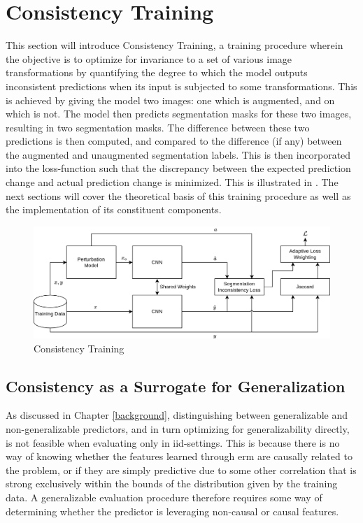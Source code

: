 \section{Consistency Training}
This section will introduce Consistency Training, a training procedure wherein the objective is to optimize for invariance to a set of various image transformations by quantifying the degree to which the model outputs inconsistent predictions when its input is subjected to some transformations. This is achieved by giving the model two images: one which is augmented, and on which is not. The model then predicts segmentation masks for these two images, resulting in two segmentation masks. The difference between these two predictions is then computed, and compared to the difference (if any) between the augmented and unaugmented segmentation labels. This is then incorporated into the loss-function such that the discrepancy between the expected prediction change and actual prediction change is minimized. This is illustrated in . The next sections will cover the theoretical basis of this training procedure as well as the implementation of its constituent components.  

\begin{figure}[ht]
    \centering
    \includegraphics[width=\linewidth]{illustrations/consistency_training.png}
    \caption{Consistency Training}
    \label{fig:consistency_training}
\end{figure}


\subsection{Consistency as a Surrogate for Generalization}\label{consistency_conceptual}
As discussed in Chapter \ref{background}, distinguishing between generalizable and non-generalizable predictors, and in turn optimizing for generalizability directly, is not feasible when evaluating only in iid-settings. This is because there is no way of knowing whether the features learned through \gls{erm} are causally related to the problem, or if they are simply predictive due to some other correlation that is strong exclusively within the bounds of the distribution given by the training data. A generalizable evaluation procedure therefore requires some way of determining whether the predictor is leveraging non-causal or causal features. 

